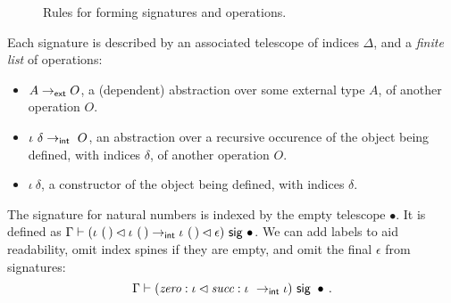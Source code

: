 \begin{figure}[H]
  \caption{Rules for forming signatures and operations.}
\end{figure}

Each signature is described by an associated telescope of indices $\Delta$, and a
\emph{finite list} of operations:
\begin{itemize}
    \item $A \to_{\textsf{ext}} O$, a (dependent) abstraction over some external type $A$, of another operation $O$.
    \item $\iota\ \delta \to\internal \ O$, an
      abstraction over a recursive occurence of
      the object being defined, with indices $\delta$, of another operation
      $O$.
    \item $\iota\ \delta$, a constructor of the object being defined, with indices $\delta$.
\end{itemize}

\begin{example}\label{ex:nat-sig}
The signature for natural numbers is indexed by the empty telescope $\bullet$.
It is defined as $\Gamma \vdash (\iota\ (\,) \lhd \iota\ (\,) \to_{\textsf{int}}
\iota\ (\,) \lhd \epsilon) \ \textsf{sig}\  \bullet$. We can add labels to aid readability,
omit index spines if they are empty, and omit the final $\epsilon$ from
signatures:
\[
\Gamma \vdash (\textit{zero} : \iota \lhd \textit{succ} : \iota\ \to_{\textsf{int}}
\iota) \ \textsf{sig}\  \bullet \,.
\]
\end{example}

